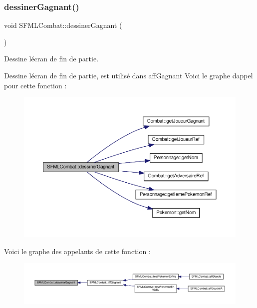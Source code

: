 \subsubsection{\texorpdfstring{dessiner\+Gagnant()}{dessinerGagnant()}}
{\footnotesize\ttfamily void S\+F\+M\+L\+Combat\+::dessiner\+Gagnant (\begin{DoxyParamCaption}{ }\end{DoxyParamCaption})\hspace{0.3cm}{\ttfamily [private]}}



Dessine l\textquotesingle{}écran de fin de partie. 

Dessine l\textquotesingle{}écran de fin de partie, est utilisé dans aff\+Gagnant Voici le graphe d\textquotesingle{}appel pour cette fonction \+:\nopagebreak
\begin{figure}[H]
\begin{center}
\leavevmode
\includegraphics[width=350pt]{class_s_f_m_l_combat_aea2c9616512a2cb0c5e7e2f676a5daab_cgraph}
\end{center}
\end{figure}
Voici le graphe des appelants de cette fonction \+:\nopagebreak
\begin{figure}[H]
\begin{center}
\leavevmode
\includegraphics[width=350pt]{class_s_f_m_l_combat_aea2c9616512a2cb0c5e7e2f676a5daab_icgraph}
\end{center}
\end{figure}
\mbox{\label{class_s_f_m_l_combat_a82520574af06d7d4bcb145f0a37fe691}} 
